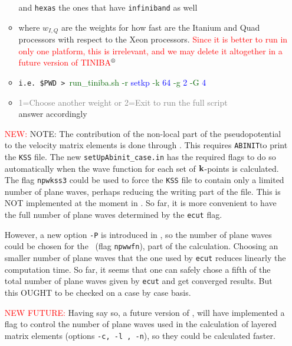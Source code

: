 \documentclass[12pt]{article}
\numberwithin{equation}{section}
\begin{document}
\begin{enumerate}
\begin{itemize}
  and \verb=hexas= the ones
  that have \verb=infiniband= as well
\item where $w_{I,Q}$ are the weights for how fast are the Itanium and Quad processors with respect to the Xeon processors.
\textcolor{red}{Since it is better to run in only one platform, this
  is irrelevant, and we may delete it altogether in a future version
  of TINIBA${\reg}$
}
\item
 \verb=i.e. $PWD > =\textcolor{darkgreen}{run\_tiniba.sh}
\textcolor{darkgreen}{-r} \textcolor{blue}{setkp} 
\textcolor{darkgreen}{-k} \textcolor{blue}{64} 
\textcolor{darkgreen}{-g} \textcolor{blue}{2} 
\textcolor{darkgreen}{-G} \textcolor{blue}{4} 

\item \textcolor{gray}{1=Choose another weight or
	2=Exit to run the full script}\\answer accordingly
\end{itemize}
\textcolor{red}{NEW:}  
NOTE: The contribution 
of the non-local part of the pseudopotential to the velocity matrix elements 
is done through \depe. This requires \verb=ABINIT=\copyr to print the
\verb=KSS= file. The new \verb=setUpAbinit_case.in= has the required
flags to do so automatically when the wave function for each set of
$\mathbf{k}$-points is calculated. The flag \verb=npwkss3= 
could be used to
force the \verb=KSS= file to contain only a limited number of plane
waves, perhaps reducing the writing part of the file. This is NOT
implemented at the moment in \tiniba. So far, it is more
convenient to have the full number of plane waves determined by the
\verb=ecut= flag.

However, a new option \verb=-P= is introduced in \tiniba, so the
number of plane waves could be chosen for the \depe~(flag \verb=npwwfn=), part of the calculation.
Choosing an smaller number of plane waves that the one used by
\verb=ecut= reduces linearly the computation time. So far, it seems
that one can safely chose a fifth of the total number of plane waves
given by \verb=ecut= and get converged results. But this OUGHT to be
checked on a case by case basis.

\textcolor{red}{NEW FUTURE:}  
Having say so, a future version of \tiniba, will have implemented 
 a flag to control the number of plane waves used in the calculation
 of layered matrix elements (options
\verb=-c, -l , -n=), so they could be calculated faster.


\end{enumerate}
\end{document}
